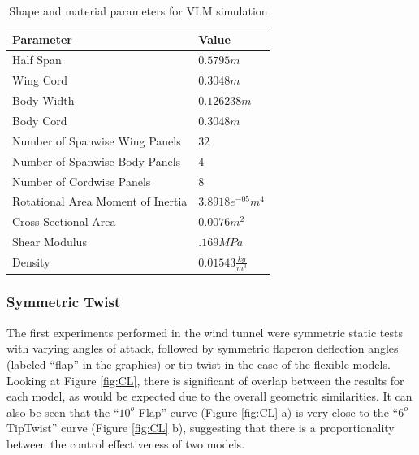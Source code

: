 \documentclass[11pt]{ucthesis}
\begin{document}
\begin{table}[h]
\begin{center}
\caption{Shape and material parameters for VLM simulation}
\label{tab:vlmConfig}
\begin{tabular}{  p{6cm} p{1.9cm}}
Parameter&Value\\\hline
Half Span&$0.5795m$\\
Wing Cord&$0.3048m$\\
Body Width&$0.126238m$\\
Body Cord&$0.3048m$\\
Number of Spanwise Wing Panels&$32$\\
Number of Spanwise Body Panels&$4$\\
Number of Cordwise Panels&$8$\\
Rotational Area Moment of Inertia&$3.8918e^{-05}m^4$\\
Cross Sectional Area&$0.0076m^2$\\
Shear Modulus&$.169 MPa$\\
Density&$0.01543\frac{kg}{m^3}$\\
\end{tabular}
\end{center}
\end{table}  

\subsubsection{Symmetric Twist}

The first experiments performed in the wind tunnel were symmetric static tests with varying angles of attack, followed by symmetric flaperon deflection angles (labeled “flap” in the graphics) or tip twist in the case of the flexible models. Looking at Figure \ref{fig:CL}, there is significant of overlap between the results for each model, as would be expected due to the overall geometric similarities. It can also be seen that the “$10^o$ Flap” curve (Figure \ref{fig:CL} a) is very close to the “$6^o$ TipTwist” curve (Figure \ref{fig:CL} b), suggesting that there is a proportionality between the control effectiveness of two models.
\end{document}
